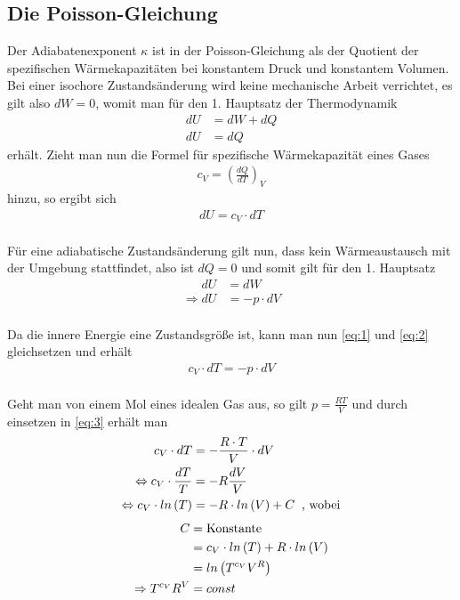 \documentclass[12pt, a4paper, twoside]{scrartcl}
\begin{document}
\subsection{Die Poisson-Gleichung}
Der Adiabatenexponent $\kappa$ ist in der Poisson-Gleichung als der Quotient der spezifischen Wärmekapazitäten bei konstantem Druck und konstantem Volumen.\\
Bei einer isochore Zustandsänderung wird keine mechanische Arbeit verrichtet, es gilt also $dW = 0$, womit man für den 1. Hauptsatz der Thermodynamik 
\begin{align*}
dU &= dW + dQ \\
dU &= dQ
\end{align*}
erhält. Zieht man nun die Formel für spezifische Wärmekapazität eines Gases
\begin{align*}
c_V = \left( \frac{dQ}{dT} \right)_V
\end{align*}
hinzu, so ergibt sich 
\begin{align}
\label{eq:1}
dU = c_V \cdot dT
\end{align}\\
Für eine adiabatische Zustandsänderung gilt nun, dass kein Wärmeaustausch mit der Umgebung stattfindet, also ist $dQ = 0$ und somit gilt für den 1. Hauptsatz
\begin{align*}
dU &= dW
\end{align*}
\begin{align}
\label{eq:2}
\Rightarrow dU &= -p \cdot dV
\end{align}\\
Da die innere Energie eine Zustandsgröße ist, kann man nun \ref{eq:1} und \ref{eq:2} gleichsetzen und erhält 
\begin{align}
\label{eq:3}
c_V \cdot dT = - p \cdot dV
\end{align}\\
Geht man von einem Mol eines idealen Gas aus, so gilt $p = \frac{RT}{V}$ und durch einsetzen in \ref{eq:3} erhält man
\begin{align*}
c_V \cdot dT &= - \frac{R\cdot T}{V}\cdot dV \\
\mathrel{\Leftrightarrow} c_V \cdot \frac{dT}{T} &= - R \frac{dV}{V} \\
\mathrel{\Leftrightarrow} c_V \cdot ln\left(T\right) &=  - R \cdot ln\left(V\right) + C \textnormal{\;\;, wobei}
\end{align*}
\begin{align}
C &= \textnormal{Konstante} \nonumber\\
&= c_V \cdot ln\left(T\right) + R \cdot ln\left(V\right) \nonumber\\
&= ln\left(T^{c_V}V^R\right) \nonumber\\
\Rightarrow T^{c_V}R^V &= const   \label{eq:4}
\end{align}
\end{document}
